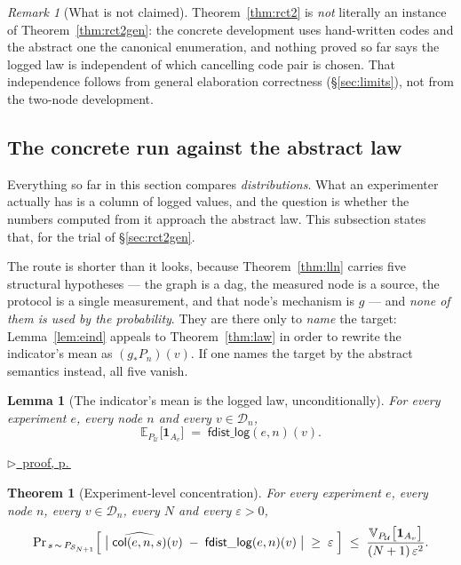 \documentclass[11pt,a4paper]{article}
\theoremstyle{definition}
\theoremstyle{plain}
\newtheorem{theorem}[definition]{Theorem}
\newtheorem{lemma}[definition]{Lemma}
\theoremstyle{remark}
\newtheorem{remark}[definition]{Remark}
\newcommand{\dom}{\mathcal{D}}
\newcommand{\Ctx}{\mathcal{U}}         %
\newcommand{\push}[1]{{#1}_{*}}        %
\newcommand{\Smp}{\mathcal{S}}         %
\newcommand{\emp}[1]{\widehat{#1}}
\newcommand{\Ind}[1]{\mathbf{1}_{#1}}
\newcommand{\Ex}{\mathbb{E}}
\newcommand{\Var}{\mathbb{V}}
\renewcommand{\Pr}{\mathrm{Pr}}
\newcommand{\pfref}[1]{%
  \par\smallskip\noindent
  \hyperref[pf:#1]{\small$\triangleright$\ proof, p.\,\pageref{pf:#1}}\par\smallskip}
\begin{document}
\begin{remark}[What is not claimed]
\label{rem:notinstance}
Theorem~\ref{thm:rct2} is \emph{not} literally an instance of
Theorem~\ref{thm:rct2gen}: the concrete development uses hand-written
codes and the abstract one the canonical enumeration, and nothing proved
so far says the logged law is independent of which cancelling code pair is
chosen. That independence follows from general elaboration correctness
(\S\ref{sec:limits}), not from the two-node development.
\end{remark}

\subsection{The concrete run against the abstract law}
\label{sec:rct2emp}

Everything so far in this section compares \emph{distributions}. What an
experimenter actually has is a column of logged values, and the question
is whether the numbers computed from it approach the abstract law. This
subsection states that, for the trial of \S\ref{sec:rct2gen}.

The route is shorter than it looks, because Theorem~\ref{thm:lln} carries
five structural hypotheses --- the graph is a dag, the measured node is a
source, the protocol is a single measurement, and that node's mechanism is
$g$ --- and \emph{none of them is used by the probability}. They are there
only to \emph{name} the target: Lemma~\ref{lem:eind} appeals to
Theorem~\ref{thm:law} in order to rewrite the indicator's mean as
$(\push{g}P_n)(v)$. If one names the target by the abstract semantics
instead, all five vanish.

\begin{lemma}[The indicator's mean is the logged law, unconditionally]
\label{lem:eindany}
For every experiment $e$, every node $n$ and every $v \in \dom_n$,
\[
  \Ex_{P_\Ctx}\bigl[\Ind{A_v}\bigr] \;=\; \mathsf{fdist\_log}(e,n)(v) .
\]
\end{lemma}

\pfref{lem:eindany}

\begin{theorem}[Experiment-level concentration]
\label{thm:llnany}
For every experiment $e$, every node $n$, every $v \in \dom_n$, every $N$
and every $\varepsilon > 0$,
\[
  \Pr_{\,s \,\sim\, P_{\Smp_{N+1}}}
  \Bigl[\;
     \bigl|\;\emp{\mathsf{col}(e,n,s)}(v)
            \;-\; \mathsf{fdist\_log}(e,n)(v)\;\bigr|
     \;\ge\; \varepsilon
  \;\Bigr]
  \;\le\;
  \frac{\Var_{P_\Ctx}\bigl[\Ind{A_v}\bigr]}{(N+1)\,\varepsilon^{2}} .
\]
\end{theorem}
\end{document}
